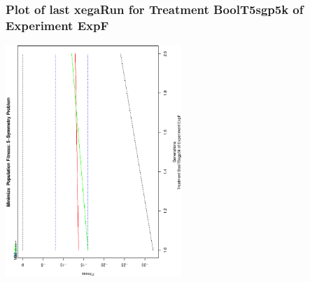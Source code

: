  \begin{frame}
 \frametitle{ Plot of last xegaRun for Treatment BoolT5sgp5k of Experiment ExpF }
 \begin{center}
\includegraphics[width=0.5\textwidth, angle=-90]
{ExpFPlotPopStatsFigure006.eps}
 \end{center}
 \label{report/ExpFPlotPopStatsFigure006.eps}  
 \end{frame}

